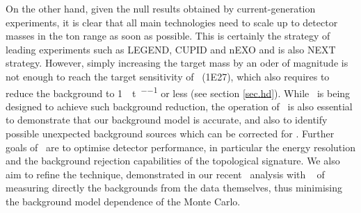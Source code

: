 On the other hand, given the null results obtained 
by current-generation experiments, it is clear that all main technologies need to scale up to detector masses in the ton range as soon as possible. This is certainly the strategy of leading experiments such as LEGEND, CUPID and nEXO and is also NEXT strategy. However, simply increasing the target mass by an oder of magnitude is not enough to reach the target sensitivity of \NHD\ (\SI{1E27}{\yr}), which also requires to reduce the background to \SI{1}{\ev\per\tonne\per\yr} or less (see section \ref{sec.hd}). While \NHD\ is being designed to achieve such background reduction, the operation of \Next\ is also essential to demonstrate that our background model is accurate, and also to identify possible unexpected background sources which can be corrected for \NHD. Further goals of \Next\ are to optimise detector performance, in particular the energy resolution and the background rejection capabilities of the topological signature. We also aim to refine the technique, demonstrated in our recent \bbtnu\ analysis with \NEW\ \cite{nextcollaboration2021measurement} of measuring directly the backgrounds from the data themselves, thus minimising the background model dependence of the Monte Carlo.  




